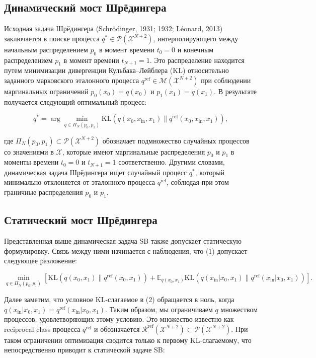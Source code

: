 \documentclass{article}
\begin{document}
\subsection{Динамический мост Шрёдингера}
 Исходная задача Шрёдингера (Schrödinger, 1931; 1932; Léonard, 2013) заключается в поиске процесса \( q^* \in \mathcal{P}(\mathcal{X}^{N+2}) \), интерполирующего между начальным распределением \( p_0 \) в момент времени \( t_0 = 0 \) и конечным распределением \( p_1 \) в момент времени \( t_{N+1} = 1 \). Это распределение находится путем минимизации дивергенции Кульбака–Лейблера (KL) относительно заданного марковского эталонного процесса \( q^{\text{ref}} \in \mathcal{M}(\mathcal{X}^{N+2}) \) при соблюдении маргинальных ограничений \( p_0(x_0) = q(x_0) \) и \( p_1(x_1) = q(x_1) \). В результате получается следующий оптимальный процесс:

\[q^* = \arg\min_{q \in \Pi_N(p_0, p_1)} \text{KL} \left( q(x_0, x_{\text{in}}, x_1) \| q^{\text{ref}}(x_0, x_{\text{in}}, x_1) \right),\]

где \( \Pi_N(p_0, p_1) \subset \mathcal{P}(\mathcal{X}^{N+2}) \) обозначает подмножество случайных процессов со значениями в \( \mathcal{X} \), которые имеют маргинальные распределения \( p_0 \) и \( p_1 \) в моменты времени \( t_0 = 0 \) и \( t_{N+1} = 1 \) соответственно. Другими словами, динамическая задача Шрёдингера ищет случайный процесс \( q^* \), который минимально отклоняется от эталонного процесса \( q^{\text{ref}} \), соблюдая при этом граничные распределения \( p_0 \) и \( p_1 \).
\subsection{Статический мост Шрёдингера}
 Представленная выше динамическая задача SB также допускает статическую формулировку. Связь между ними начинается с наблюдения, что (1) допускает следующее разложение:

\[
\min_{q \in \Pi_N(p_0, p_1)} \left[ \text{KL} \left( q(x_0, x_1) \| q^{\text{ref}}(x_0, x_1) \right) + \mathbb{E}_{q(x_0, x_1)} \text{KL} \left( q(x_{\text{in}}|x_0, x_1) \| q^{\text{ref}}(x_{\text{in}}|x_0, x_1) \right) \right]. \tag{2}
\]

Далее заметим, что условное KL-слагаемое в (2) обращается в ноль, когда \( q(x_{\text{in}}|x_0, x_1) = q^{\text{ref}}(x_{\text{in}}|x_0, x_1) \). Таким образом, мы ограничиваем \( q \) множеством процессов, удовлетворяющих этому условию. Это множество известно как reciprocal class процесса \( q^{\text{ref}} \) и обозначается \( \mathcal{R}^{\text{ref}}(\mathcal{X}^{N+2}) \subset \mathcal{P}(\mathcal{X}^{N+2}) \). При таком ограничении оптимизация сводится только к первому KL-слагаемому, что непосредственно приводит к статической задаче SB:
\end{document}
